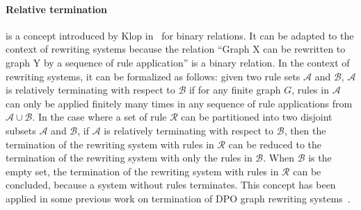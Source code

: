 \paragraph{Relative termination} is a concept introduced by Klop in~\cite{klop1987term} for binary relations. It can be adapted to the context of rewriting systems because the relation \enquote{Graph X can be rewritten to graph Y by a sequence of rule application} is a binary relation. In the context of rewriting systems, it can be formalized as follows:
 given two rule sets \( \mathcal{A} \) and \( \mathcal{B} \), \( \mathcal{A} \) is relatively terminating with respect to \( \mathcal{B} \) if for any finite graph $G$,
rules in $\mathcal{A}$ can only be applied finitely many times in any sequence of rule applications from $\mathcal{A} \cup \mathcal{B}$. In the case where a set of rule $\mathcal{R}$ can be partitioned into two disjoint subsets \( \mathcal{A} \) and \( \mathcal{B} \), if \( \mathcal{A} \) is relatively terminating with respect to \( \mathcal{B} \), then the termination of the rewriting system with rules in \( \mathcal{R} \) can be reduced to the termination of the rewriting system with only the rules in \( \mathcal{B} \). When \( \mathcal{B} \) is the empty set, the termination of the rewriting system with rules in \( \mathcal{R} \) can be concluded, because a system without rules terminates.
This concept has been applied in some previous work on termination of DPO graph rewriting systems~\cite{zantema2014termination,bruggink2014termination,bruggink2015proving,endrullis2024generalized_icgt}.

